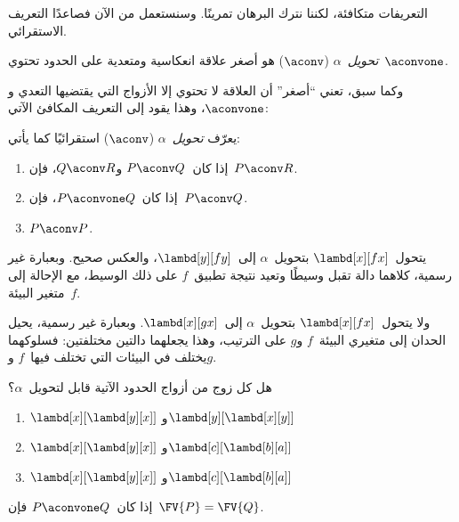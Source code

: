 \documentclass[../../../include/open-logic-section]{subfiles}
\begin{document}
التعريفات متكافئة، لكننا نترك البرهان تمرينًا. وسنستعمل من الآن فصاعدًا
التعريف الاستقرائي.

\begin{defn}
  \emph{تحويل~$\alpha$} ($\aconv$) هو أصغر علاقة انعكاسية ومتعدية على
  الحدود تحتوي~$\aconvone$.
\end{defn}

وكما سبق، تعني ``أصغر'' أن العلاقة لا تحتوي إلا الأزواج التي يقتضيها
التعدي و$\aconvone$، وهذا يقود إلى التعريف المكافئ الآتي:

\begin{defn} 
  يعرّف \emph{تحويل~$\alpha$} ($\aconv$) استقرائيًا كما يأتي:
  \begin{enumerate}
  \item إذا كان~$P \aconv Q$ و$Q \aconv R$، فإن~$P \aconv R$.
  \item إذا كان~$P \aconvone Q$، فإن~$P \aconv Q$. 
  \item $P \aconv P$. 
  \end{enumerate}
\end{defn}

\begin{ex}
  يتحول~$\lambd[x][f x]$ بتحويل~$\alpha$ إلى~$\lambd[y][f
  y]$، والعكس صحيح. وبعبارة غير رسمية، كلاهما دالة تقبل وسيطًا وتعيد
  نتيجة تطبيق~$f$ على ذلك الوسيط، مع الإحالة إلى متغير البيئة~$f$.

  ولا يتحول~$\lambd[x][f x]$ بتحويل~$\alpha$ إلى~$\lambd[x][g
    x]$. وبعبارة غير رسمية، يحيل الحدان إلى متغيري البيئة~$f$ و$g$ على
  الترتيب، وهذا يجعلهما دالتين مختلفتين: فسلوكهما يختلف في البيئات التي
  تختلف فيها~$f$ و$g$.
\end{ex}

\begin{prob}
  هل كل زوج من أزواج الحدود الآتية قابل لتحويل~$\alpha$؟
  \begin{enumerate}
  \item $\lambd[x][\lambd[y][x]]$ و$\lambd[y][\lambd[x][y]]$
  \item $\lambd[x][\lambd[y][x]]$ و$\lambd[c][\lambd[b][a]]$
  \item $\lambd[x][\lambd[y][x]]$ و$\lambd[c][\lambd[b][a]]$
  \end{enumerate}
\end{prob}

\begin{lem}
  إذا كان~$P \aconvone Q$ فإن~$\FV{P} = \FV{Q}$.
\end{lem}
\end{document}
